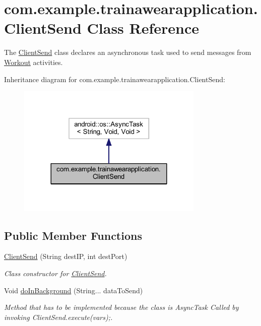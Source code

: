 \hypertarget{classcom_1_1example_1_1trainawearapplication_1_1_client_send}{}\section{com.\+example.\+trainawearapplication.\+Client\+Send Class Reference}
\label{classcom_1_1example_1_1trainawearapplication_1_1_client_send}


The \mbox{\hyperlink{classcom_1_1example_1_1trainawearapplication_1_1_client_send}{Client\+Send}} class declares an asynchronous task used to send messages from \mbox{\hyperlink{classcom_1_1example_1_1trainawearapplication_1_1_workout}{Workout}} activities.  




Inheritance diagram for com.\+example.\+trainawearapplication.\+Client\+Send\+:
\nopagebreak
\begin{figure}[H]
\begin{center}
\leavevmode
\includegraphics[width=252pt]{classcom_1_1example_1_1trainawearapplication_1_1_client_send__inherit__graph}
\end{center}
\end{figure}
\subsection*{Public Member Functions}
\begin{DoxyCompactItemize}
\item 
\mbox{\hyperlink{classcom_1_1example_1_1trainawearapplication_1_1_client_send_ab1f011085d4305f586a7074a46e73450}{Client\+Send}} (String dest\+IP, int dest\+Port)
\begin{DoxyCompactList}\small\item\em Class constructor for \mbox{\hyperlink{classcom_1_1example_1_1trainawearapplication_1_1_client_send}{Client\+Send}}. \end{DoxyCompactList}\item 
Void \mbox{\hyperlink{classcom_1_1example_1_1trainawearapplication_1_1_client_send_ad8e0bcd2078b23e83c1060065834ae7d}{do\+In\+Background}} (String... data\+To\+Send)
\begin{DoxyCompactList}\small\item\em Method that has to be implemented because the class is Async\+Task Called by invoking Client\+Send.\+execute(vars);. \end{DoxyCompactList}\end{DoxyCompactItemize}
